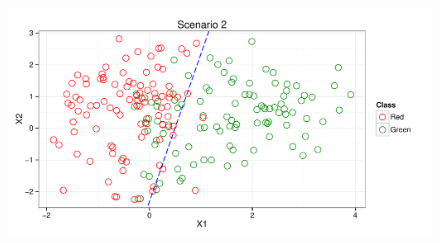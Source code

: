 \documentclass{article}
\begin{document}
\begin{enumerate}
\begin{figure}[h]
\begin{center}
\end{center}
\end{figure} 
\begin{figure}[h]
\begin{center}
\includegraphics{Homework1-003}
\end{center}
\end{figure} 
\end{enumerate}
\end{document}
